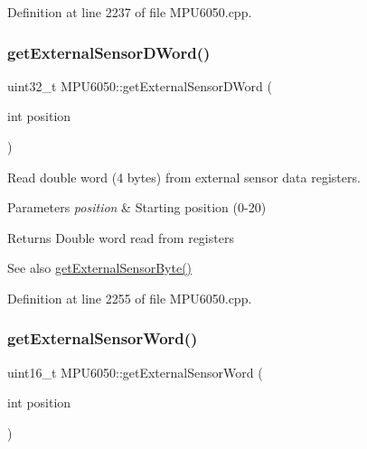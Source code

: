 Definition at line 2237 of file M\+P\+U6050.\+cpp.

\mbox{\label{classMPU6050_afd8983f0911e37015434bebc85185fb2}} 
\subsubsection{\texorpdfstring{getExternalSensorDWord()}{getExternalSensorDWord()}}
{\footnotesize\ttfamily uint32\+\_\+t M\+P\+U6050\+::get\+External\+Sensor\+D\+Word (\begin{DoxyParamCaption}\item[{int}]{position }\end{DoxyParamCaption})}



Read double word (4 bytes) from external sensor data registers. 


\begin{DoxyParams}{Parameters}
{\em position} & Starting position (0-\/20) \\
\hline
\end{DoxyParams}
\begin{DoxyReturn}{Returns}
Double word read from registers 
\end{DoxyReturn}
\begin{DoxySeeAlso}{See also}
\mbox{\hyperlink{classMPU6050_a7f786ab4264f40e5a95e8937ec9adcc2}{get\+External\+Sensor\+Byte()}} 
\end{DoxySeeAlso}


Definition at line 2255 of file M\+P\+U6050.\+cpp.

\mbox{\label{classMPU6050_aaee15e48af7ba78660b5754f3bb5f37a}} 
\subsubsection{\texorpdfstring{getExternalSensorWord()}{getExternalSensorWord()}}
{\footnotesize\ttfamily uint16\+\_\+t M\+P\+U6050\+::get\+External\+Sensor\+Word (\begin{DoxyParamCaption}\item[{int}]{position }\end{DoxyParamCaption})}



